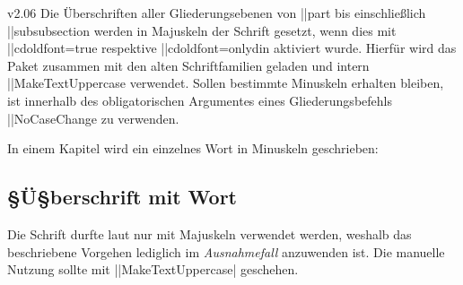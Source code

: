 \begin{Entity}{}
\begin{Changes}{v2.06}
%
Die Überschriften aller Gliederungsebenen von \Macro||{part} bis einschließlich 
\Macro||{subsubsection} werden in Majuskeln der Schrift \DIN gesetzt, wenn dies 
mit \Option||{cdoldfont=true} respektive \Option||{cdoldfont=onlydin} aktiviert 
wurde. Hierfür wird das Paket  zusammen mit den alten 
Schriftfamilien geladen und intern \Macro||{MakeTextUppercase} verwendet. 
Sollen bestimmte Minuskeln erhalten bleiben, ist innerhalb des obligatorischen 
Argumentes eines Gliederungsbefehls \Macro||{NoCaseChange} zu verwenden.
%
\begin{Example}
In einem Kapitel wird ein einzelnes Wort in Minuskeln geschrieben:
\begin{Code}[escapechar=§]
\chapter{§Ü§berschrift mit  Wort}
\end{Code}
\end{Example}
%
Die Schrift \DIN durfte laut \CD nur mit Majuskeln verwendet werden, weshalb 
das beschriebene Vorgehen lediglich im \emph{Ausnahmefall} anzuwenden ist. 
Die manuelle Nutzung sollte mit 
\Macro||{MakeTextUppercase|} geschehen.%
%
\end{Changes}
\end{Entity}